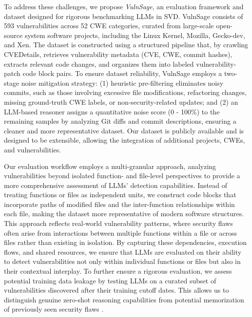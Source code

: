\documentclass[sigconf]{acmart}
\begin{document}
To address these challenges, we propose \textit{VulnSage}, an evaluation framework and dataset designed for rigorous benchmarking LLMs in SVD. VulnSage consists of 593 vulnerabilities across 52 CWE categories, curated from large-scale open-source system software projects, including the Linux Kernel, Mozilla, Gecko-dev, and Xen. The dataset is constructed using a structured pipeline that, by crawling CVEDetails,  retrieves vulnerability metadata (CVE, CWE, commit hashes), extracts relevant code changes, and organizes them into labeled vulnerability-patch code block pairs. To ensure dataset reliability, VulnSage employs a two-stage noise mitigation strategy:
(1) heuristic pre-filtering eliminates noisy commits, such as those involving excessive file modifications, refactoring changes, missing ground-truth CWE labels, or non-security-related updates; and (2) an LLM-based reasoner assigns a quantitative noise score (0 - 100\%) to the remaining samples by analyzing Git diffs and commit descriptions, ensuring a cleaner and more representative dataset. Our dataset is publicly available and is designed to be extensible, allowing the integration of additional projects, CWEs, and vulnerabilities.

Our evaluation workflow employs a multi-granular approach, analyzing vulnerabilities beyond isolated function- and file-level perspectives to provide a more comprehensive assessment of LLMs' detection capabilities. Instead of treating functions or files as independent units, we construct code blocks that incorporate paths of modified files and the inter-function relationships within each file, making the dataset more representative of modern software structures. This approach reflects real-world vulnerability patterns, where security flaws often arise from interactions between multiple functions within a file or across files rather than existing in isolation. By capturing these dependencies, execution flows, and shared resources, we ensure that LLMs are evaluated on their ability to detect vulnerabilities not only within individual functions or files but also in their contextual interplay. To further ensure a rigorous evaluation, we assess potential training data leakage by testing LLMs on a curated subset of vulnerabilities discovered after their training cutoff dates. This allows us to distinguish genuine zero-shot reasoning capabilities from potential memorization of previously seen security flaws \cite{carlini2022quantifying, zibaeirad2024comprehensive}.
\end{document}
